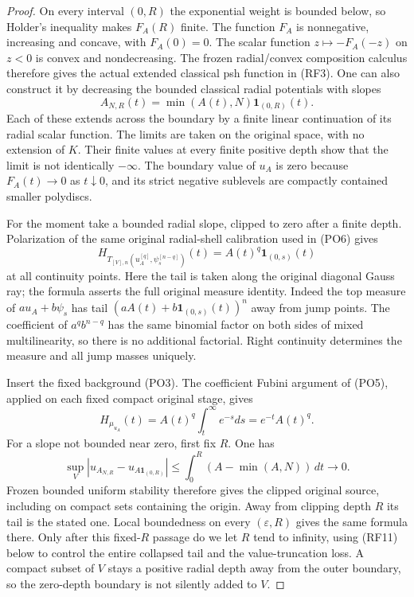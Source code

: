 \documentclass[11pt,a4paper]{article}
\numberwithin{equation}{section}
\theoremstyle{definition}
\theoremstyle{remark}
\begin{document}
\begin{proof}
On every interval $(0,R)$ the exponential weight is bounded
below, so Holder's inequality makes $F_A(R)$ finite.
The function $F_A$ is nonnegative, increasing and concave,
with $F_A(0)=0$.  The scalar function
$z\mapsto-F_A(-z)$ on $z<0$ is convex and nondecreasing.
The frozen radial/convex composition calculus therefore gives
the actual extended classical psh function in \textup{(RF3)}.
One can also construct it by decreasing the bounded classical
radial potentials with slopes
\[
                  A_{N,R}(t)=\min(A(t),N)\mathbf1_{(0,R)}(t).
 \tag{RF8}
\]
Each of these extends across the boundary by a finite linear
continuation of its radial scalar function.  The limits are
taken on the original space, with no extension of $K$.
Their finite values at every finite positive depth show
that the limit is not identically $-\infty$.  The boundary value of $u_A$ is zero
because $F_A(t)\to0$ as $t\downarrow0$, and its strict
negative sublevels are compactly contained smaller polydiscs.

For the moment take a bounded radial slope, clipped to zero
after a finite depth.  Polarization of the same original
radial-shell calibration used in \textup{(PO6)} gives
\[
 H_{T_{[V],n}(u_A^{[q]},\psi_s^{[n-q]})}(t)
                      =A(t)^q\mathbf1_{(0,s)}(t)
 \tag{RF9}
\]
at all continuity points.  Here the tail is taken along the
original diagonal Gauss ray; the formula asserts the full
original measure identity.  Indeed the top measure of
$a u_A+b\psi_s$ has tail
$(aA(t)+b\mathbf1_{(0,s)}(t))^n$ away from jump points.
The coefficient of $a^qb^{n-q}$ has the same binomial
factor on both sides of mixed multilinearity, so there is
no additional factorial.  Right continuity determines the
measure and all jump masses uniquely.

Insert the fixed background \textup{(PO3)}.  The coefficient
Fubini argument of \textup{(PO5)}, applied on each fixed
compact original stage, gives
\[
          H_{\mu_{u_A}}(t)
                =A(t)^q\int_t^\infty e^{-s}ds
                =e^{-t}A(t)^q.
 \tag{RF10}
\]
For a slope not bounded near zero, first fix $R$.  One has
\[
 \sup_V\left|u_{A_{N,R}}-u_{A\mathbf1_{(0,R)}}\right|
        \le\int_0^R(A-\min(A,N))\,dt\longrightarrow0.
\]
Frozen bounded uniform stability therefore gives the
clipped original source, including on compact sets
containing the origin.  Away from clipping depth $R$
its tail is the stated one.  Local boundedness on
every $(\varepsilon,R)$ gives the same formula there.
Only after this fixed-$R$ passage do we let $R$ tend
to infinity, using \textup{(RF11)} below to control
the entire collapsed tail and the value-truncation loss.
A compact subset of $V$ stays a positive radial depth
away from the outer boundary, so the zero-depth boundary
is not silently added to $V$.


\end{proof}
\end{document}
